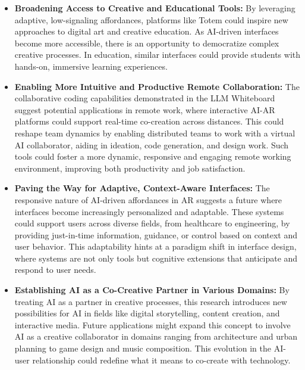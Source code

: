 \begin{itemize}
    \item \textbf{Broadening Access to Creative and Educational Tools:}
    By leveraging adaptive, low-signaling affordances, platforms like Totem could inspire new approaches to digital art and creative education.
    As AI-driven interfaces become more accessible, there is an opportunity to democratize complex creative processes.%
    In education, similar interfaces could provide students with hands-on, immersive learning experiences.%

    \item \textbf{Enabling More Intuitive and Productive Remote Collaboration:}
    The collaborative coding capabilities demonstrated in the LLM Whiteboard suggest potential applications in remote work, where interactive AI-AR platforms could support real-time co-creation across distances.
    This could reshape team dynamics by enabling distributed teams to work with a virtual AI collaborator, aiding in ideation, code generation, and design work.
    Such tools could foster a more dynamic, responsive and engaging remote working environment, improving both productivity and job satisfaction.

    \item \textbf{Paving the Way for Adaptive, Context-Aware Interfaces:}
    The responsive nature of AI-driven affordances in AR suggests a future where interfaces become increasingly personalized and adaptable.
    These systems could support users across diverse fields, from healthcare to engineering, by providing just-in-time information, guidance, or control based on context and user behavior.
    This adaptability hints at a paradigm shift in interface design, where systems are not only tools but cognitive extensions that anticipate and respond to user needs.

    \item \textbf{Establishing AI as a Co-Creative Partner in Various Domains:}
    By treating AI as a partner in creative processes, this research introduces new possibilities for AI in fields like digital storytelling, content creation, and interactive media.
    Future applications might expand this concept to involve AI as a creative collaborator in domains ranging from architecture and urban planning to game design and music composition.
    This evolution in the AI-user relationship could redefine what it means to co-create with technology.%


\end{itemize}
